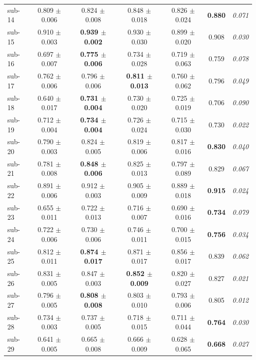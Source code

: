 \begin{table}[t]
\begin{tabular}{lcccccc}
sub-14 & 0.809 $\pm$ 0.006 & 0.824 $\pm$ 0.008 & 0.848 $\pm$ 0.018 & 0.826 $\pm$ 0.024 & \textbf{0.880} & \textit{0.071} \\
sub-15 & 0.910 $\pm$ 0.003 & \textbf{0.939 $\pm$ 0.002} & 0.930 $\pm$ 0.030 & 0.899 $\pm$ 0.020 & 0.908 & \textit{0.030} \\
sub-16 & 0.697 $\pm$ 0.007 & \textbf{0.775 $\pm$ 0.006} & 0.734 $\pm$ 0.028 & 0.719 $\pm$ 0.063 & 0.759 & \textit{0.078} \\
sub-17 & 0.762 $\pm$ 0.006 & 0.796 $\pm$ 0.006 & \textbf{0.811 $\pm$ 0.013} & 0.760 $\pm$ 0.062 & 0.796 & \textit{0.049} \\
sub-18 & 0.640 $\pm$ 0.017 & \textbf{0.731 $\pm$ 0.004} & 0.730 $\pm$ 0.020 & 0.725 $\pm$ 0.019 & 0.706 & \textit{0.090} \\
sub-19 & 0.712 $\pm$ 0.004 & \textbf{0.734 $\pm$ 0.004} & 0.726 $\pm$ 0.024 & 0.715 $\pm$ 0.030 & 0.730 & \textit{0.022} \\
sub-20 & 0.790 $\pm$ 0.003 & 0.824 $\pm$ 0.005 & 0.819 $\pm$ 0.006 & 0.817 $\pm$ 0.016 & \textbf{0.830} & \textit{0.040} \\
sub-21 & 0.781 $\pm$ 0.008 & \textbf{0.848 $\pm$ 0.006} & 0.825 $\pm$ 0.013 & 0.797 $\pm$ 0.089 & 0.829 & \textit{0.067} \\
sub-22 & 0.891 $\pm$ 0.006 & 0.912 $\pm$ 0.003 & 0.905 $\pm$ 0.009 & 0.889 $\pm$ 0.018 & \textbf{0.915} & \textit{0.024} \\
sub-23 & 0.655 $\pm$ 0.011 & 0.722 $\pm$ 0.013 & 0.716 $\pm$ 0.007 & 0.690 $\pm$ 0.016 & \textbf{0.734} & \textit{0.079} \\
sub-24 & 0.722 $\pm$ 0.006 & 0.730 $\pm$ 0.006 & 0.746 $\pm$ 0.011 & 0.700 $\pm$ 0.015 & \textbf{0.756} & \textit{0.034} \\
sub-25 & 0.812 $\pm$ 0.011 & \textbf{0.874 $\pm$ 0.017} & 0.871 $\pm$ 0.017 & 0.856 $\pm$ 0.017 & 0.839 & \textit{0.062} \\
sub-26 & 0.831 $\pm$ 0.005 & 0.847 $\pm$ 0.003 & \textbf{0.852 $\pm$ 0.009} & 0.820 $\pm$ 0.027 & 0.827 & \textit{0.021} \\
sub-27 & 0.796 $\pm$ 0.005 & \textbf{0.808 $\pm$ 0.008} & 0.803 $\pm$ 0.010 & 0.793 $\pm$ 0.006 & 0.805 & \textit{0.012} \\
sub-28 & 0.734 $\pm$ 0.003 & 0.737 $\pm$ 0.005 & 0.718 $\pm$ 0.015 & 0.711 $\pm$ 0.044 & \textbf{0.764} & \textit{0.030} \\
sub-29 & 0.641 $\pm$ 0.005 & 0.665 $\pm$ 0.008 & 0.666 $\pm$ 0.009 & 0.628 $\pm$ 0.065 & \textbf{0.668} & \textit{0.027} \\

\end{tabular}
\end{table}
